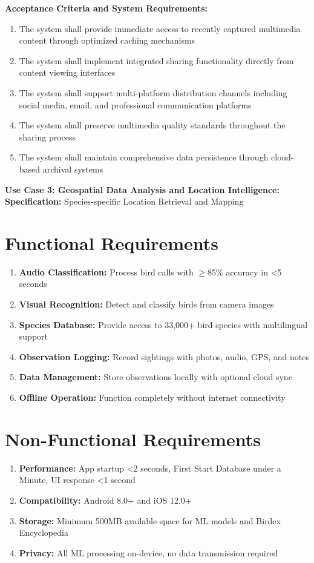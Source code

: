 \textbf{Acceptance Criteria and System Requirements:}
\begin{enumerate}
    \item The system shall provide immediate access to recently captured multimedia content through optimized caching mechanisms
    \item The system shall implement integrated sharing functionality directly from content viewing interfaces
    \item The system shall support multi-platform distribution channels including social media, email, and professional communication platforms
    \item The system shall preserve multimedia quality standards throughout the sharing process
    \item The system shall maintain comprehensive data persistence through cloud-based archival systems
\end{enumerate}

\textbf{Use Case 3: Geospatial Data Analysis and Location Intelligence:}
\textbf{Specification:} Species-specific Location Retrieval and Mapping


\section{Functional Requirements}

\begin{enumerate}
    \item \textbf{Audio Classification:} Process bird calls with $\geq$85\% accuracy in <5 seconds
    \item \textbf{Visual Recognition:} Detect and classify birds from camera images
    \item \textbf{Species Database:} Provide access to 33,000+ bird species with multilingual support
    \item \textbf{Observation Logging:} Record sightings with photos, audio, GPS, and notes
    \item \textbf{Data Management:} Store observations locally with optional cloud sync
    \item \textbf{Offline Operation:} Function completely without internet connectivity
\end{enumerate}

\section{Non-Functional Requirements}

\begin{enumerate}
    \item \textbf{Performance:} App startup <2 seconds, First Start Database under a Minute, UI response <1 second
    \item \textbf{Compatibility:} Android 8.0+ and iOS 12.0+
    \item \textbf{Storage:} Minimum 500MB available space for ML models and Birdex Encyclopedia
    \item \textbf{Privacy:} All ML processing on-device, no data transmission required
\end{enumerate}

